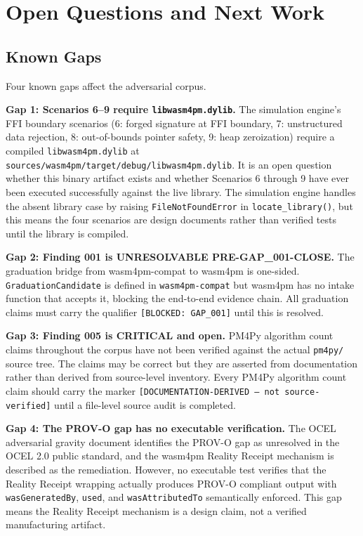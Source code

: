 
\section{Open Questions and Next Work}
\label{sec:adversarial-questions}

\subsection{Known Gaps}
\label{sec:adversarial-questions-gaps}

Four known gaps affect the adversarial corpus.

\textbf{Gap 1: Scenarios 6--9 require \texttt{libwasm4pm.dylib}.} The simulation engine's
FFI boundary scenarios (6: forged signature at FFI boundary, 7: unstructured data rejection,
8: out-of-bounds pointer safety, 9: heap zeroization) require a compiled
\texttt{libwasm4pm.dylib} at
\texttt{sources/wasm4pm/target/debug/libwasm4pm.dylib}. It is an open question whether this
binary artifact exists and whether Scenarios 6 through 9 have ever been executed successfully
against the live library. The simulation engine handles the absent library case by raising
\texttt{FileNotFoundError} in \texttt{locate\_library()}, but this means the four scenarios
are design documents rather than verified tests until the library is compiled.

\textbf{Gap 2: Finding 001 is UNRESOLVABLE PRE-GAP\_001-CLOSE.} The graduation bridge from
wasm4pm-compat to wasm4pm is one-sided. \texttt{GraduationCandidate} is defined in
\texttt{wasm4pm-compat} but wasm4pm has no intake function that accepts it, blocking the
end-to-end evidence chain. All graduation claims must carry the qualifier
\texttt{[BLOCKED: GAP\_001]} until this is resolved.

\textbf{Gap 3: Finding 005 is CRITICAL and open.} PM4Py algorithm count claims throughout
the corpus have not been verified against the actual \texttt{pm4py/} source tree. The claims
may be correct but they are asserted from documentation rather than derived from source-level
inventory. Every PM4Py algorithm count claim should carry the marker
\texttt{[DOCUMENTATION-DERIVED --- not source-verified]} until a file-level source audit is
completed.

\textbf{Gap 4: The PROV-O gap has no executable verification.} The OCEL adversarial gravity
document identifies the PROV-O gap as unresolved in the OCEL 2.0 public standard, and the
wasm4pm Reality Receipt mechanism is described as the remediation. However, no executable
test verifies that the Reality Receipt wrapping actually produces PROV-O compliant output
with \texttt{wasGeneratedBy}, \texttt{used}, and \texttt{wasAttributedTo} semantically
enforced. This gap means the Reality Receipt mechanism is a design claim, not a verified
manufacturing artifact.

